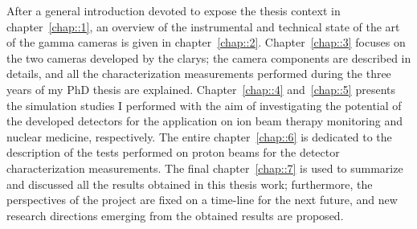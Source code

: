 After a general introduction devoted to expose the thesis context in chapter~\ref{chap::1}, an overview of the instrumental and technical state of the art of the gamma cameras is given in chapter~\ref{chap::2}. Chapter~\ref{chap::3} focuses on the two cameras developed by the \gls{clarys}; the camera components are described in details, and all the characterization measurements performed during the three years of my PhD thesis are explained. Chapter~\ref{chap::4} and~\ref{chap::5} presents the simulation studies I performed with the aim of investigating the potential of the developed detectors for the application on ion beam therapy monitoring and nuclear medicine, respectively. The entire chapter~\ref{chap::6} is dedicated to the description of the tests performed on proton beams for the detector characterization measurements. The final chapter~\ref{chap::7} is used to summarize and discussed all the results obtained in this thesis work; furthermore, the perspectives of the project are fixed on a time-line for the next future, and new research directions emerging from the obtained results are proposed.        